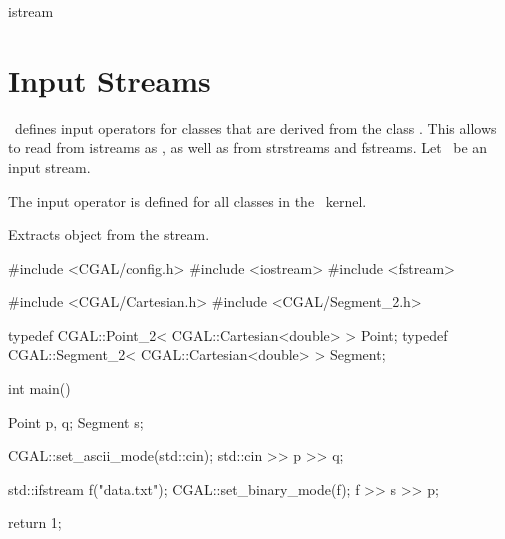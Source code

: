 \newpage
\begin{ccClass} {istream}
\section{Input Streams}

\ccDefinition
\cgal\  defines input operators for classes that are derived
from the class . This allows to read from istreams
as , as well as from strstreams and fstreams.
Let \ccVar\ be an input stream.

\ccOperations

The input operator is defined for all classes in the \cgal\ kernel.

{Extracts object  from the stream.}


\ccExample

\begin{cprog}

#include <CGAL/config.h>
#include <iostream>
#include <fstream>

#include <CGAL/Cartesian.h>
#include <CGAL/Segment_2.h>

typedef CGAL::Point_2< CGAL::Cartesian<double> >     Point;
typedef CGAL::Segment_2< CGAL::Cartesian<double> >   Segment;

int
main()
{
    Point p, q;
    Segment s;

    CGAL::set_ascii_mode(std::cin);
    std::cin >> p >> q;

    std::ifstream f("data.txt");
    CGAL::set_binary_mode(f);
    f >> s >> p;

    return 1;
}
\end{cprog} 
\end{ccClass} 
